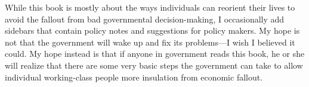 \documentclass[letterpaper]{article}
\begin{document}
{\color{black}
While this book is mostly about the ways individuals can reorient their
lives to avoid the fallout from bad governmental decision-making, I
occasionally add sidebars that contain policy notes
\textcolor[rgb]{0.32941177,0.5529412,0.83137256}{and} suggestions for
policy makers. My hope is not that the government will wake up and fix
its problems—I wish I believed it could. My hope instead is that if
\textcolor[rgb]{0.32941177,0.5529412,0.83137256}{anyone in government}
reads this book, \textcolor[rgb]{0.32941177,0.5529412,0.83137256}{he or
she} will realize that there are some very basic steps
the\textcolor[rgb]{0.32941177,0.5529412,0.83137256}{ government can
take to} allow individual working-class people
\textcolor[rgb]{0.32941177,0.5529412,0.83137256}{more insulation from
economic fallout}. }
\end{document}
